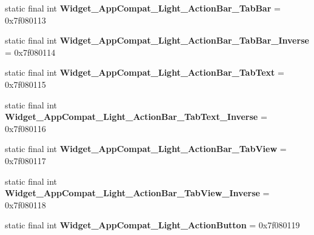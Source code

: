 \begin{DoxyCompactItemize}
\item 
\hypertarget{classandroid_1_1support_1_1v7_1_1appcompat_1_1_r_1_1style_a800eec571c7a3a5ae7c9bd34d4de3e2a}{}static final int {\bfseries Widget\+\_\+\+App\+Compat\+\_\+\+Light\+\_\+\+Action\+Bar\+\_\+\+Tab\+Bar} = 0x7f080113\label{classandroid_1_1support_1_1v7_1_1appcompat_1_1_r_1_1style_a800eec571c7a3a5ae7c9bd34d4de3e2a}

\item 
\hypertarget{classandroid_1_1support_1_1v7_1_1appcompat_1_1_r_1_1style_a2a321c12e9a90c9c2654c6360a358680}{}static final int {\bfseries Widget\+\_\+\+App\+Compat\+\_\+\+Light\+\_\+\+Action\+Bar\+\_\+\+Tab\+Bar\+\_\+\+Inverse} = 0x7f080114\label{classandroid_1_1support_1_1v7_1_1appcompat_1_1_r_1_1style_a2a321c12e9a90c9c2654c6360a358680}

\item 
\hypertarget{classandroid_1_1support_1_1v7_1_1appcompat_1_1_r_1_1style_a9a3d404e709ccc4b6451719ce94471a8}{}static final int {\bfseries Widget\+\_\+\+App\+Compat\+\_\+\+Light\+\_\+\+Action\+Bar\+\_\+\+Tab\+Text} = 0x7f080115\label{classandroid_1_1support_1_1v7_1_1appcompat_1_1_r_1_1style_a9a3d404e709ccc4b6451719ce94471a8}

\item 
\hypertarget{classandroid_1_1support_1_1v7_1_1appcompat_1_1_r_1_1style_af00d7bda4d003b15deeea158f097f0d5}{}static final int {\bfseries Widget\+\_\+\+App\+Compat\+\_\+\+Light\+\_\+\+Action\+Bar\+\_\+\+Tab\+Text\+\_\+\+Inverse} = 0x7f080116\label{classandroid_1_1support_1_1v7_1_1appcompat_1_1_r_1_1style_af00d7bda4d003b15deeea158f097f0d5}

\item 
\hypertarget{classandroid_1_1support_1_1v7_1_1appcompat_1_1_r_1_1style_ac19404a25cb26fbc8d23bca6ce4d090d}{}static final int {\bfseries Widget\+\_\+\+App\+Compat\+\_\+\+Light\+\_\+\+Action\+Bar\+\_\+\+Tab\+View} = 0x7f080117\label{classandroid_1_1support_1_1v7_1_1appcompat_1_1_r_1_1style_ac19404a25cb26fbc8d23bca6ce4d090d}

\item 
\hypertarget{classandroid_1_1support_1_1v7_1_1appcompat_1_1_r_1_1style_a21a9aa7a229e40e4a8c82c548231428b}{}static final int {\bfseries Widget\+\_\+\+App\+Compat\+\_\+\+Light\+\_\+\+Action\+Bar\+\_\+\+Tab\+View\+\_\+\+Inverse} = 0x7f080118\label{classandroid_1_1support_1_1v7_1_1appcompat_1_1_r_1_1style_a21a9aa7a229e40e4a8c82c548231428b}

\item 
\hypertarget{classandroid_1_1support_1_1v7_1_1appcompat_1_1_r_1_1style_acaf931b355085f1113e3b6eb704675ae}{}static final int {\bfseries Widget\+\_\+\+App\+Compat\+\_\+\+Light\+\_\+\+Action\+Button} = 0x7f080119\label{classandroid_1_1support_1_1v7_1_1appcompat_1_1_r_1_1style_acaf931b355085f1113e3b6eb704675ae}


\end{DoxyCompactItemize}
